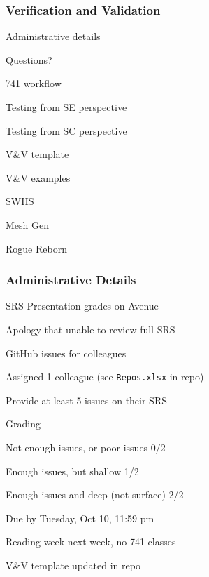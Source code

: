 \documentclass[t,12pt,numbers,fleqn]{beamer}
\begin{document}



\begin{frame}
\frametitle{Verification and Validation}

\bi
\item Administrative details
\item Questions?
\item 741 workflow
\item Testing from SE perspective
\item Testing from SC perspective
\item V\&V template
\item V\&V examples
\bi
\item SWHS
\item Mesh Gen
\item Rogue Reborn
\ei
\ei
\end{frame}


\begin{frame}
\frametitle{Administrative Details}

\bi
\item SRS Presentation grades on Avenue
\item Apology that unable to review full SRS
\item GitHub issues for colleagues
\bi
\item Assigned 1 colleague (see \texttt{Repos.xlsx} in repo)
\item Provide at least 5 issues on their SRS
\item Grading
\bi
\item Not enough issues, or poor issues 0/2
\item Enough issues, but shallow 1/2
\item Enough issues and deep (not surface) 2/2
\ei
\item Due by Tuesday, Oct 10, 11:59 pm
\ei
\item Reading week next week, no 741 classes
\item V\&V template updated in repo
\ei

\end{frame}

\end{document}
